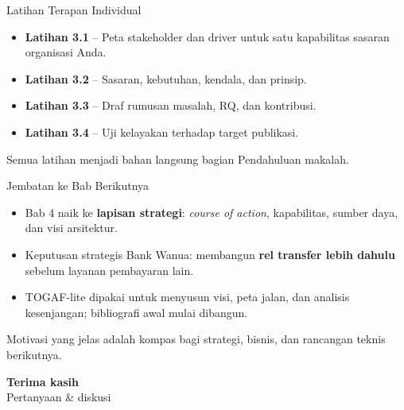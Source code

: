 \documentclass[aspectratio=169, table]{beamer}
\newcommand{\takeaway}[1]{%
  \vspace{4pt}
  {\footnotesize #1}
}
\begin{document}
\begin{frame}{Latihan Terapan Individual}
  \vspace{8pt}
  \begin{itemize}
    \item \textbf{Latihan 3.1} -- Peta stakeholder dan driver untuk satu
          kapabilitas sasaran organisasi Anda.
    \item \textbf{Latihan 3.2} -- Sasaran, kebutuhan, kendala, dan prinsip.
    \item \textbf{Latihan 3.3} -- Draf rumusan masalah, RQ, dan kontribusi.
    \item \textbf{Latihan 3.4} -- Uji kelayakan terhadap target publikasi.
  \end{itemize}
  \takeaway{Semua latihan menjadi bahan langsung bagian Pendahuluan makalah.}
\end{frame}

\begin{frame}{Jembatan ke Bab Berikutnya}
  \vspace{8pt}
  \begin{itemize}
    \item Bab 4 naik ke \textbf{lapisan strategi}: \emph{course of action},
          kapabilitas, sumber daya, dan visi arsitektur.
    \item Keputusan strategis Bank Wanua: membangun \textbf{rel transfer lebih
          dahulu} sebelum layanan pembayaran lain.
    \item TOGAF-lite dipakai untuk menyusun visi, peta jalan, dan analisis
          kesenjangan; bibliografi awal mulai dibangun.
  \end{itemize}
  \takeaway{Motivasi yang jelas adalah kompas bagi strategi, bisnis, dan
  rancangan teknis berikutnya.}
\end{frame}

\begin{frame}{\hfill}
  \centering
  \Huge{\textbf{Terima kasih}}\\[8pt]
  \normalsize Pertanyaan \& diskusi
\end{frame}
\end{document}
